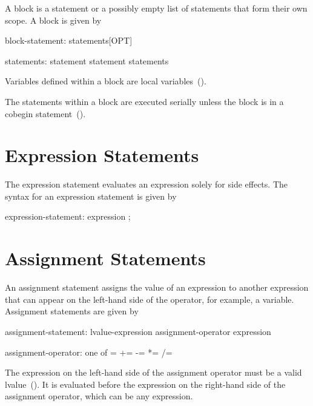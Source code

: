 
A block is a statement or a possibly empty list of statements that
form their own scope.  A block is given by
\begin{syntax}
block-statement:
  { statements[OPT] }

statements:
  statement
  statement statements
\end{syntax}

Variables defined within a block are local
variables~().

The statements within a block are executed serially unless the block
is in a cobegin statement~().

\section{Expression Statements}
\label{Expression_Statements}

The expression statement evaluates an expression solely for side
effects. The syntax for an expression statement is given by
\begin{syntax}
expression-statement:
  expression ;
\end{syntax}

\section{Assignment Statements}
\label{Assignment_Statements}

An assignment statement assigns the value of an expression to another
expression that can appear on the left-hand side of the operator, for
example, a variable.  Assignment statements are given by

\begin{syntax}
assignment-statement:
  lvalue-expression assignment-operator expression

assignment-operator: one of
   = += -= *= /= %
\end{syntax}

The expression on the left-hand side of the assignment operator must
be a valid lvalue~().  It is evaluated before the
expression on the right-hand side of the assignment operator, which
can be any expression.

